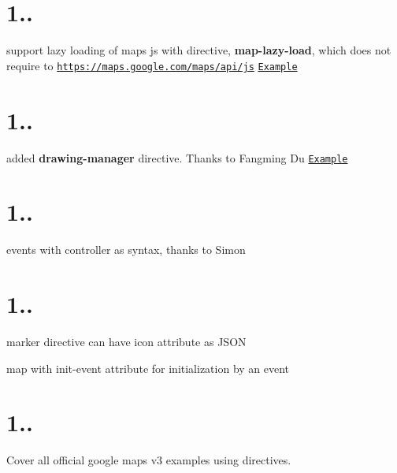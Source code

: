 \section*{1..}


\begin{DoxyItemize}
\item support lazy loading of maps js with directive, {\bfseries map-\/lazy-\/load}, which does not require to {\ttfamily \href{https://maps.google.com/maps/api/js}{\tt https\+://maps.\+google.\+com/maps/api/js}} \href{https://rawgit.com/allenhwkim/angularjs-google-maps/master/testapp/map-lazy-load.html}{\tt Example}
\end{DoxyItemize}

\section*{1..}


\begin{DoxyItemize}
\item added {\bfseries drawing-\/manager} directive. Thanks to Fangming Du \href{https://rawgit.com/allenhwkim/angularjs-google-maps/master/testapp/drawing-manager.html}{\tt Example}
\end{DoxyItemize}

\section*{1..}


\begin{DoxyItemize}
\item events with {\ttfamily controller as} syntax, thanks to Simon
\end{DoxyItemize}

\section*{1..}


\begin{DoxyItemize}
\item marker directive can have icon attribute as J\+S\+ON
\item map with init-\/event attribute for initialization by an event
\end{DoxyItemize}

\section*{1..}


\begin{DoxyItemize}
\item Cover all official google maps v3 examples using directives. 
\end{DoxyItemize}